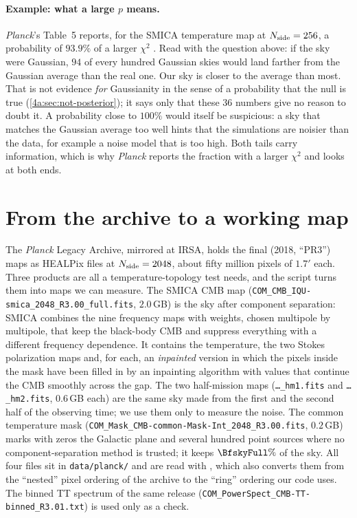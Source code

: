 \paragraph{Example: what a large $p$ means.} \textit{Planck}'s Table~5 reports, for the SMICA temperature map at
$N_{\rm side}=256$, a probability of $93.9\%$ of a larger $\chi^2$ \cite{Planck2018VII}. Read with the question
above: if the sky were Gaussian, $94$ of every hundred Gaussian skies would land farther from the Gaussian
average than the real one. Our sky is closer to the average than most. That is not evidence \emph{for}
Gaussianity in the sense of a probability that the null is true (\cref{4a:sec:not-posterior}); it says only that
these $36$ numbers give no reason to doubt it. A probability close to $100\%$ would itself be suspicious: a sky
that matches the Gaussian average too well hints that the simulations are noisier than the data, for example a
noise model that is too high. Both tails carry information, which is why \textit{Planck} reports the fraction
with a larger $\chi^2$ and looks at both ends.
\section{From the archive to a working map}
\label{13b:sec:data}

The \textit{Planck} Legacy Archive, mirrored at IRSA, holds the final (2018, ``PR3'') maps as HEALPix files at
$N_{\rm side}=2048$, about fifty million pixels of $1.7'$ each. Three products are all a temperature-topology test
needs, and the script  turns them into maps we can measure. The SMICA CMB map
(\texttt{COM\_CMB\_IQU-smica\_2048\_R3.00\_full.fits}, $2.0$\,GB) is the sky after component separation: SMICA
combines the nine frequency maps with weights, chosen multipole by multipole, that keep the black-body CMB and
suppress everything with a different frequency dependence. It contains the temperature, the two Stokes
polarization maps and, for each, an \emph{inpainted} version in which the pixels inside the mask have been
filled in by an inpainting algorithm with values that continue the CMB smoothly across the gap. The two half-mission maps (\texttt{\dots\_hm1.fits} and
\texttt{\dots\_hm2.fits}, $0.6$\,GB each) are the same sky made from the first and the second half of the
observing time; we use them only to measure the noise. The common temperature mask
(\texttt{COM\_Mask\_CMB-common-Mask-Int\_2048\_R3.00.fits}, $0.2$\,GB) marks with zeros the Galactic plane
and several hundred point sources where no component-separation method is trusted; it keeps
$\BfskyFull\%$ of the sky. All four files sit in \texttt{data/planck/} and are read with ,
which also converts them from the ``nested'' pixel ordering of the archive to the ``ring'' ordering our code
uses. The binned TT spectrum of the same release (\texttt{COM\_PowerSpect\_CMB-TT-binned\_R3.01.txt}) is used
only as a check.

